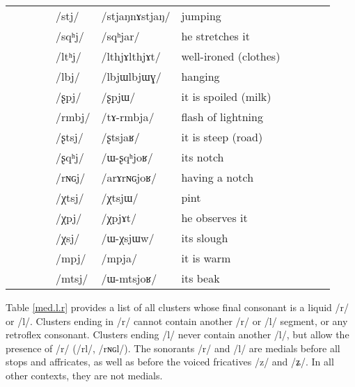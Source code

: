 \documentclass[oldfontcommands,oneside,a4paper,11pt]{article}
\newcommand{\ipa}[1]{{\phon/#1/}} %
\newcommand{\trois}[1]{/#1/}
\newcommand{\tib}[1]{\cellcolor{lightgray}\textbf{#1}}
\newcommand{\idph}[1]{\cellcolor{gray}\textbf{#1}}
\begin{document}
\begin{table}
{\begin{tabular}{l|lll|lll|lll|l}
 		 		& 		&		&		&\trois{stj}  \idph{}		&\ipa{stjaŋnɤstjaŋ} 		&jumping \\
 		& 		&		&		&\trois{sqʰj} 		&\ipa{sqʰjar} 		& he stretches it\\
\midrule										
 		& 		&		&		&\trois{ltʰj}  \idph{}		&\ipa{lthjɤlthjɤt} 		&well-ironed (clothes)\\
 		& 		&		&		&\trois{lbj} \idph{}		&\ipa{lbjɯlbjɯɣ} 		&hanging\\
\midrule												
 		& 		&		&		&\trois{ʂpj} 		&\ipa{ʂpjɯ} 		&it is spoiled (milk)\\
 		& 		&		&		&\trois{rmbj} 		&\ipa{tɤ-rmbja} 		&flash of lightning\\
 		& 		&		&		&\trois{ʂtsj} 		&\ipa{ʂtsjaʁ} 		&it is steep (road)\\
 		& 		&		&		&\trois{ʂqʰj} 		&\ipa{ɯ-ʂqʰjoʁ} 		&its notch\\
 		& 		&		&		&\trois{rɴɢj} 		&\ipa{arɤrɴɢjoʁ} 		&having a notch\\
\midrule												
 		& 		&		&		&\trois{χtsj} 		&\ipa{χtsjɯ} 		&pint\\
 		& 		&		&		&\trois{χpj} \tib{}		&\ipa{χpjɤt} 		&he  observes it\\
 		& 		&		&		&\trois{χsj} 		&\ipa{ɯ-χsjɯw} 		&its slough \\
\midrule												
 		& 		&		&		&\trois{mpj} 		&\ipa{mpja} 		&it is warm\\
 		& 		&		&		&\trois{mtsj} 		&\ipa{ɯ-mtsjoʁ} 		&its beak\\
\end{tabular}}
\end{table}
 
  
  Table  \ref{med.l.r} provides a  list of all clusters whose final consonant is a liquid  \ipa{r} or \ipa{l}. Clusters ending in \ipa{r} cannot contain another \ipa{r} or \ipa{l} segment, or any retroflex consonant. Clusters ending \ipa{l} never contain another \ipa{l}, but allow the presence of \ipa{r} (\ipa{rl}, \ipa{rɴɢl}). The sonorants \ipa{r} and \ipa{l} are medials before all stops and affricates, as well as before the voiced fricatives \ipa{z} and \ipa{ʑ}. In all other contexts, they are not medials.
  
\end{document}
